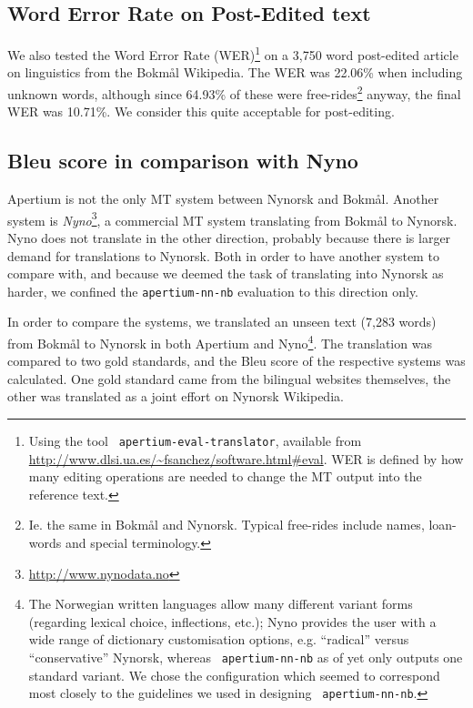 \documentclass[11pt]{article}
\newcommand{\comment}[1]{\textbf{SKRIV} {\it #1}}
\renewcommand{\comment}[1]{}
\begin{document}
\subsection{Word Error Rate on Post-Edited text}
\label{sec:WER}
We also tested the Word Error Rate (WER)\footnote{Using the tool {\tt
    \small apertium-eval-translator}, available from
  \href{http://www.dlsi.ua.es/~fsanchez/software.html\#eval}{http://www.dlsi.ua.es/\~{}fsanchez/software.html\#eval}. WER
  is defined by how many editing operations are needed to change the
  MT output into the reference text.}
on a 3,750 word post-edited
article on linguistics from the Bokmål Wikipedia. The WER was 22.06\%
when including unknown words, although since 64.93\% of these were
free-rides\footnote{Ie. the same in Bokmål and Nynorsk. Typical
  free-rides include names, loan-words and special terminology.}
anyway, the final WER was 10.71\%. We consider this quite acceptable
for post-editing.

\comment{More WER explanation? Levenshtein/Edit distance, substitution/insertion/deletion? Or a citation instead?}

\subsection{{\sc Bleu} score in comparison with Nyno}

Apertium is not the only MT system between Nynorsk and Bokmål. Another
system is
\textit{Nyno}\footnote{\href{http://www.nynodata.no}{http://www.nynodata.no}},
a commercial MT system translating from Bokmål to Nynorsk. Nyno does not 
translate in the other direction, probably because there is larger demand for 
translations to Nynorsk. Both in order to have another system to compare with, 
and because we deemed the task of translating into Nynorsk as harder, we
confined the {\tt \small apertium-nn-nb} evaluation to this direction only.

In order to compare the systems, we translated an unseen text (7,283
words) from Bokmål to Nynorsk in both Apertium and Nyno\footnote{The
  Norwegian written languages allow many different variant forms
  (regarding lexical choice, inflections, etc.); Nyno provides the
  user with a wide range of dictionary customisation options,
  e.g. ``radical'' versus ``conservative'' Nynorsk, whereas {\tt \small 
    apertium-nn-nb} as of yet only outputs one standard variant. We
  chose the \comment{standard/XYZ-}configuration which seemed to
  correspond most closely to the guidelines we used in designing {\tt \small 
    apertium-nn-nb}.}. The translation was compared to two gold
standards, and the {\sc Bleu} score \citep{papineni2001bleu} of the
respective systems was calculated. One gold standard came from the
bilingual websites themselves, the other was translated as a joint 
effort on Nynorsk Wikipedia.
\end{document}
